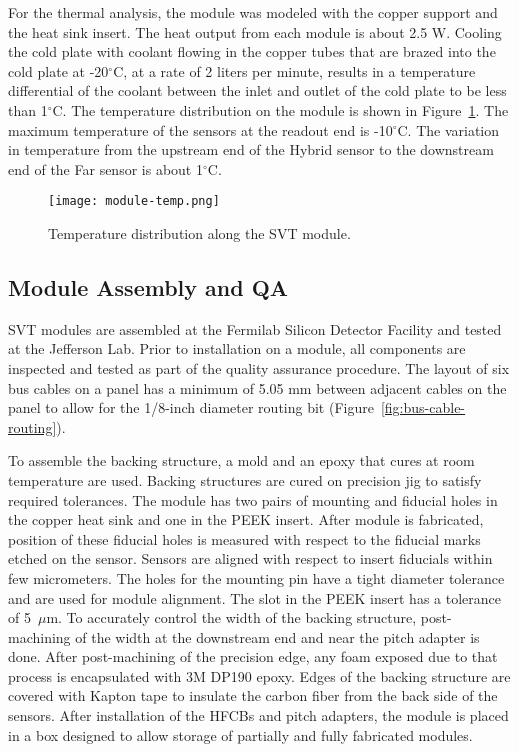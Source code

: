 For the thermal analysis, the module was modeled with the copper support and the heat sink insert. The heat output from each module is about 2.5 W. Cooling the cold plate with coolant flowing in the copper tubes that are brazed into the cold plate at -20$^\circ$C, at a rate of 2 liters per minute, results in a temperature differential of the coolant between the inlet and outlet of the cold plate to be less than 1$^\circ$C. The temperature distribution on the module is shown in Figure~\ref{fig:module-temp}. The maximum temperature of the sensors at the readout end is -10$^\circ$C. The variation in temperature from the upstream end of the Hybrid sensor to the downstream end of the Far sensor is about 1$^\circ$C.

\begin{figure}[hbt] 
\centering 
\texttt{[image: module-temp.png]}
\caption{Temperature distribution along the SVT module.}
\label{fig:module-temp}
\end{figure}

\subsection{Module Assembly and QA}

SVT modules are assembled at the Fermilab Silicon Detector Facility and tested at the Jefferson Lab. Prior to installation on a module, all components are inspected and tested as part of the quality assurance procedure.  
The layout of six bus cables on a panel has a minimum of 5.05 mm between adjacent cables on the panel to allow for the 1/8-inch diameter routing bit (Figure~\ref{fig:bus-cable-routing}).

To assemble the backing structure, a mold and an epoxy that cures at room temperature are used. Backing structures are cured on precision jig to satisfy required tolerances. The module has two pairs of mounting and fiducial holes in the copper heat sink and one in the PEEK insert. After module is fabricated, position of these fiducial holes is measured with respect to the fiducial marks etched on the sensor. Sensors are aligned with respect to insert fiducials within few micrometers. The holes for the mounting pin have a tight diameter tolerance and are used for module alignment. The slot in the PEEK insert has a tolerance of 5~$\mu$m. To accurately control the width of the backing structure, post-machining of the width at the downstream end and near the pitch adapter is done. After post-machining of the precision edge, any foam exposed due to that process is encapsulated with 3M DP190 epoxy. Edges of the backing structure are covered with Kapton tape to insulate the carbon fiber from the back side of the sensors. After installation of the HFCBs and pitch adapters, the module is placed in a box designed to allow storage of partially and fully fabricated modules.

